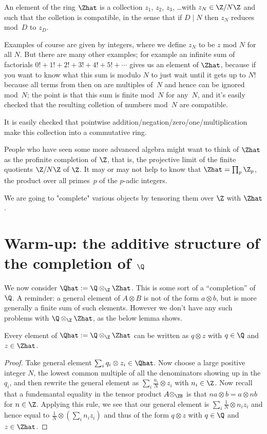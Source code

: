 An element of the ring $\Zhat$ is a collection $z_1$, $z_2$, $z_3$, \ldots with $z_N\in\Z/N\Z$
and such that the colletion is compatible, in the sense that if $D\mid N$ then $z_N$ reduces mod~$D$
to $z_D$.

Examples of course are given by integers, where we define $z_N$ to be $z$ mod $N$ for all $N$.
But there are many other examples; for example an infinite sum of factorials 
$0!+1!+2!+3!+4!+5!+\cdots$ gives us an element of $\Zhat$, because if you want to know what
this sum is modulo $N$ to just wait until it gets up to $N!$ because all terms from then on
are multiples of~$N$ and hence can be ignored mod~$N$; the point is that this sum is finite
mod~$N$ for any~$N$, and it's easily checked that the resulting colletion of numbers mod~$N$
are compatible.

It is easily checked that pointwise addition/negation/zero/one/multiplication make this
collection into a commutative ring. 

People who have seen some more advanced algebra might want to think of $\Zhat$ as
the profinite completion of $\Z$, that is, the projective limit of the finite quotients
$\Z/N\Z$ of $\Z$. It may or may not help to know that $\Zhat=\prod_p\Z_p$, the product over all
primes~$p$ of the $p$-adic integers.

We are going to "complete" various objects by tensoring them over $\Z$ with $\Zhat$.

\section{Warm-up: the additive structure of the completion of $\Q$}

We now consider $\Qhat:=\Q\otimes_{\Z}\Zhat$. This is some sort of a ``completion'' of $\Q$.
A reminder: a general element of $A\otimes B$ is not of the form $a\otimes b$, but
is more generally a finite sum of such elements. However we don't have any such
problems with $\Q\otimes_{\Z}\Zhat$, as the below lemma shows.

\begin{lemma}\label{Qhat.canonicalForm} Every element of $\Qhat:=\Q\otimes_{\Z}\Zhat$
can be written as $q\otimes z$ with $q\in\Q$ and $z\in\Zhat$.
\end{lemma}
\begin{proof} Take general element $\sum_i q_i\otimes z_i\in\Qhat$. Now choose a large 
    positive integer $N$, the lowest
common multiple of all the denominators showing up in the $q_i$, and then rewrite
the general element as $\sum_i \frac{n_i}{N}\otimes z_i$ with $n_i\in\Z$. Now recall that a fundemantal
equality in the tensor product $A\otimes_\ZB$ is that $na\otimes b=a\otimes nb$ for $n\in\Z$.
Applying this rule, we see that our general element is $\sum_i \frac{1}{N}\otimes n_i z_i$
and hence equal to $\frac{1}{N}\otimes(\sum_i n_i z_i)$ and thus of the form $q\otimes z$ with $q\in\Q$
and $z\in\Zhat$.
\end{proof}

